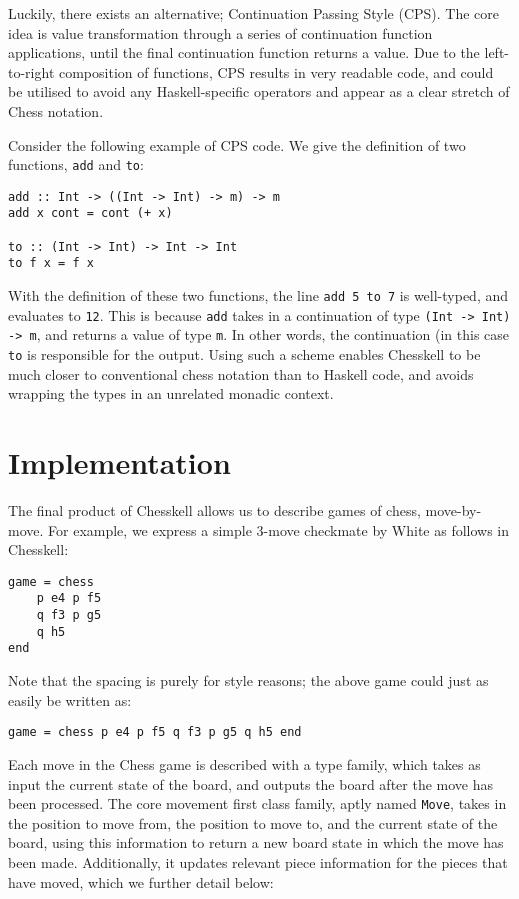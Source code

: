 \documentclass[12pt, a4paper, bibliography=totocnumbered]{scrreprt}
\newcommand{\inline}[1]{\lstinline[basicstyle=\ttfamily\footnotesize]{#1}}
\begin{document}
Luckily, there exists an alternative; Continuation Passing Style (CPS). The core idea is value transformation through a series of continuation function applications, until the final continuation function returns a value. Due to the left-to-right composition of functions, CPS results in very readable code, and could be utilised to avoid any Haskell-specific operators and appear as a clear stretch of Chess notation.

Consider the following example of CPS code. We give the definition of two functions, \inline{add} and \inline{to}:

\begin{lstlisting}
add :: Int -> ((Int -> Int) -> m) -> m
add x cont = cont (+ x)

to :: (Int -> Int) -> Int -> Int
to f x = f x
\end{lstlisting}

With the definition of these two functions, the line \inline{add 5 to 7} is well-typed, and evaluates to \inline{12}. This is because \inline{add} takes in a continuation of type \inline{(Int -> Int) -> m}, and returns a value of type \inline{m}. In other words, the continuation (in this case \inline{to} is responsible for the output. Using such a scheme enables Chesskell to be much closer to conventional chess notation than to Haskell code, and avoids wrapping the types in an unrelated monadic context.


\chapter{Implementation} \label{examplegame}

The final product of Chesskell allows us to describe games of chess, move-by-move. For example, we express a simple 3-move checkmate by White as follows in Chesskell:

\begin{lstlisting}
game = chess
    p e4 p f5
    q f3 p g5
    q h5
end
\end{lstlisting}

Note that the spacing is purely for style reasons; the above game could just as easily be written as:

\begin{lstlisting}
game = chess p e4 p f5 q f3 p g5 q h5 end
\end{lstlisting}

Each move in the Chess game is described with a type family, which takes as input the current state of the board, and outputs the board after the move has been processed. The core movement first class family, aptly named \inline{Move}, takes in the position to move from, the position to move to, and the current state of the board, using this information to return a new board state in which the move has been made. Additionally, it updates relevant piece information for the pieces that have moved, which we further detail below:
\end{document}
